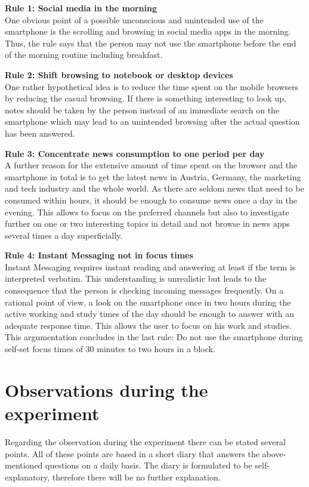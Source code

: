 \documentclass[11pt,a4paper]{article}
\begin{document}
\textbf{Rule 1: Social media in the morning}\\
One obvious point of a possible unconscious and unintended use of the smartphone is the scrolling and browsing in social media apps in the morning. Thus, the rule says that the person may not use the smartphone before the end of the morning routine including breakfast. \newline

\textbf{Rule 2: Shift browsing to notebook or desktop devices}\\
One rather hypothetical idea is to reduce the time spent on the mobile browsers by reducing the casual browsing. If there is something interesting to look up, notes should be taken by the person instead of an immediate search on the smartphone which may lead to an unintended browsing after the actual question has been answered. \newline

\textbf{Rule 3: Concentrate news consumption to one period per day}\\
A further reason for the extensive amount of time spent on the browser and the smartphone in total is to get the latest news in Austria, Germany, the marketing and tech industry and the whole world. As there are seldom news that need to be consumed within hours, it should be enough to consume news once a day in the evening. This allows to focus on the preferred channels but also to investigate further on one or two interesting topics in detail and not browse in news apps several times a day superficially. \newline

\textbf{Rule 4: Instant Messaging not in focus times}\\
Instant Messaging requires instant reading and answering at least if the term is interpreted verbatim. This understanding is unrealistic but leads to the consequence that the person is checking incoming messages frequently. On a rational point of view, a look on the smartphone once in two hours during the active working and study times of the day should be enough to answer with an adequate response time. This allows the user to focus on his work and studies. This argumentation concludes in the last rule: Do not use the smartphone during self-set focus times of 30 minutes to two hours in a block. \newline

\section*{Observations during the experiment}
Regarding the observation during the experiment there can be stated several points. All of these points are based in a short diary that answers the above-mentioned questions on a daily basis. The diary is formulated to be self-explanatory, therefore there will be no further explanation.
\end{document}
